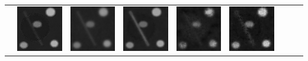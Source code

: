 \begin{tabular}{M{0.02cm}*{8}{M{2.5cm}}}
        &\includegraphics[width=\figurelength]{img/chapitre3/figure7/maps/img_4_4.png}
        &\includegraphics[width=\figurelength]{img/chapitre3/figure7/maps/img_6_4.png}
        &\includegraphics[width=\figurelength]{img/chapitre3/figure7/maps/img_7_4.png}
        &\includegraphics[width=\figurelength]{img/chapitre3/figure7/maps/img_8_4.png}
        &\includegraphics[width=\figurelength]{img/chapitre3/figure7/maps/img_9_4.png}\\
    \end{tabular}
\egroup